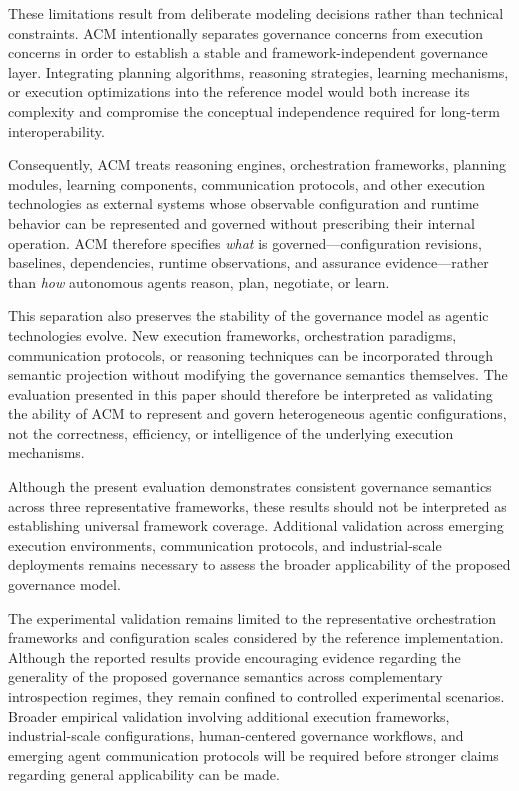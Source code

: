 \documentclass[10pt]{article}
\begin{document}
These limitations result from deliberate modeling decisions rather than technical constraints. ACM intentionally separates governance concerns from execution concerns in order to establish a stable and framework-independent governance layer. Integrating planning algorithms, reasoning strategies, learning mechanisms, or execution optimizations into the reference model would both increase its complexity and compromise the conceptual independence required for long-term interoperability.

Consequently, ACM treats reasoning engines, orchestration frameworks, planning modules, learning components, communication protocols, and other execution technologies as external systems whose observable configuration and runtime behavior can be represented and governed without prescribing their internal operation. ACM therefore specifies \emph{what} is governed---configuration revisions, baselines, dependencies, runtime observations, and assurance evidence---rather than \emph{how} autonomous agents reason, plan, negotiate, or learn.

This separation also preserves the stability of the governance model as agentic technologies evolve. New execution frameworks, orchestration paradigms, communication protocols, or reasoning techniques can be incorporated through semantic projection without modifying the governance semantics themselves. The evaluation presented in this paper should therefore be interpreted as validating the ability of ACM to represent and govern heterogeneous agentic configurations, not the correctness, efficiency, or intelligence of the underlying execution mechanisms.

Although the present evaluation demonstrates consistent governance semantics across three representative frameworks, these results should not be interpreted as establishing universal framework coverage. Additional validation across emerging execution environments, communication protocols, and industrial-scale deployments remains necessary to assess the broader applicability of the proposed governance model.

The experimental validation remains limited to the representative orchestration frameworks and configuration scales considered by the reference implementation. Although the reported results provide encouraging evidence regarding the generality of the proposed governance semantics across complementary introspection regimes, they remain confined to controlled experimental scenarios. Broader empirical validation involving additional execution frameworks, industrial-scale configurations, human-centered governance workflows, and emerging agent communication protocols will be required before stronger claims regarding general applicability can be made.
\end{document}
